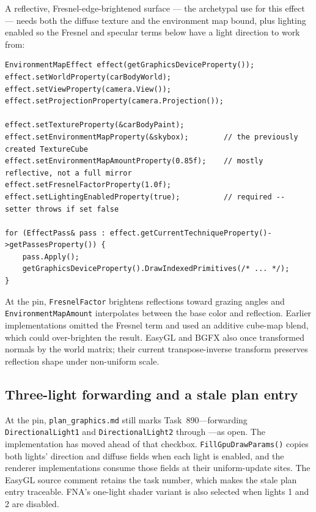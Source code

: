 A reflective, Fresnel-edge-brightened surface --- the archetypal use for this effect --- needs
both the diffuse texture and the  environment map bound, plus lighting
enabled so the Fresnel and specular terms below have a light direction to work from:

\begin{lstlisting}
EnvironmentMapEffect effect(getGraphicsDeviceProperty());
effect.setWorldProperty(carBodyWorld);
effect.setViewProperty(camera.View());
effect.setProjectionProperty(camera.Projection());

effect.setTextureProperty(&carBodyPaint);
effect.setEnvironmentMapProperty(&skybox);        // the previously created TextureCube
effect.setEnvironmentMapAmountProperty(0.85f);    // mostly reflective, not a full mirror
effect.setFresnelFactorProperty(1.0f);
effect.setLightingEnabledProperty(true);          // required -- setter throws if set false

for (EffectPass& pass : effect.getCurrentTechniqueProperty()->getPassesProperty()) {
    pass.Apply();
    getGraphicsDeviceProperty().DrawIndexedPrimitives(/* ... */);
}
\end{lstlisting}

At the pin, \texttt{FresnelFactor} brightens reflections toward grazing angles and
\texttt{EnvironmentMapAmount} interpolates between the base color and reflection. Earlier
implementations omitted the Fresnel term and used an additive cube-map blend, which could
over-brighten the result. EasyGL and BGFX also once transformed normals by the world matrix;
their current transpose-inverse transform preserves reflection shape under non-uniform scale.

\subsection{Three-light forwarding and a stale plan entry}

\begin{historynote}
At the pin, \texttt{plan\_graphics.md} still marks Task~890---forwarding
\texttt{DirectionalLight1} and \texttt{DirectionalLight2} through
---as open. The implementation has moved ahead of that checkbox.
\texttt{FillGpuDrawParams()} copies both lights' direction and diffuse fields when each light is
enabled, and the renderer implementations consume those fields at their uniform-update sites.
The EasyGL source comment retains the task number, which makes the stale plan entry traceable.
FNA's one-light shader variant is also selected when lights 1 and 2 are disabled.
\end{historynote}

